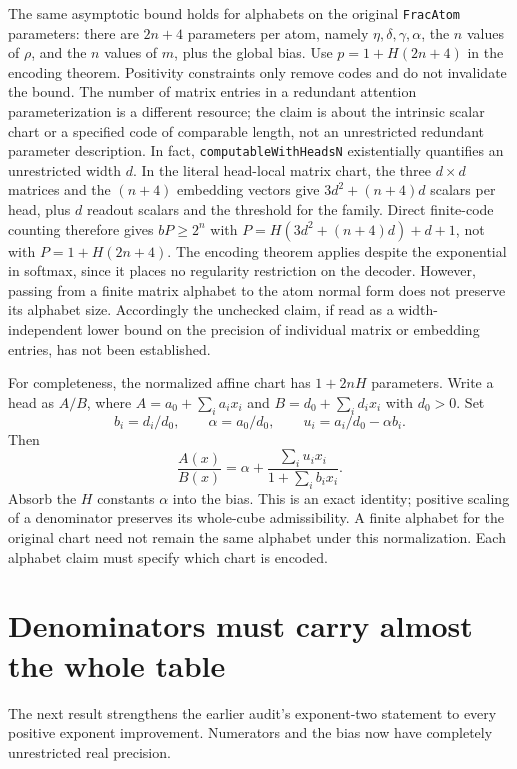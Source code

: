 \documentclass[11pt]{article}
\begin{document}
The same asymptotic bound holds for alphabets on the original
\texttt{FracAtom} parameters: there are $2n+4$ parameters per atom,
namely $\eta,\delta,\gamma,\alpha$, the $n$ values of $\rho$, and the
$n$ values of $m$, plus the global bias. Use
$p=1+H(2n+4)$ in the encoding theorem. Positivity constraints only
remove codes and do not invalidate the bound. The number of matrix
entries in a redundant attention parameterization is a different
resource; the claim is about the intrinsic scalar chart or a specified
code of comparable length, not an unrestricted redundant parameter
description. In fact, \texttt{computableWithHeadsN} existentially
quantifies an unrestricted width $d$. In the literal head-local
matrix chart, the three $d\times d$ matrices and the $(n+4)$
embedding vectors give $3d^2+(n+4)d$ scalars per head, plus $d$
readout scalars and the threshold for the family. Direct finite-code
counting therefore gives $bP\ge2^n$ with
$P=H(3d^2+(n+4)d)+d+1$, not with $P=1+H(2n+4)$.
The encoding theorem applies despite the exponential in softmax,
since it places no regularity restriction on the decoder. However,
passing from a finite matrix alphabet to the atom normal form does
not preserve its alphabet size. Accordingly the unchecked claim,
if read as a width-independent lower bound on the precision of
individual matrix or embedding entries, has not been established.

For completeness, the normalized affine chart has $1+2nH$ parameters.
Write a head as $A/B$, where
$A=a_0+\sum_i a_ix_i$ and $B=d_0+\sum_i d_ix_i$ with $d_0>0$.
Set
\[
 b_i=d_i/d_0,\qquad
 \alpha=a_0/d_0,\qquad
 u_i=a_i/d_0-\alpha b_i.
\]
Then
\[
 \frac{A(x)}{B(x)}=
 \alpha+\frac{\sum_i u_ix_i}{1+\sum_i b_ix_i}.
\]
Absorb the $H$ constants $\alpha$ into the bias. This is an exact
identity; positive scaling of a denominator preserves its whole-cube
admissibility. A finite alphabet for the original chart need not remain
the same alphabet under this normalization. Each alphabet claim must
specify which chart is encoded.

\section{Denominators must carry almost the whole table}

The next result strengthens the earlier audit's exponent-two statement
to every positive exponent improvement. Numerators and the bias now
have completely unrestricted real precision.
\end{document}
